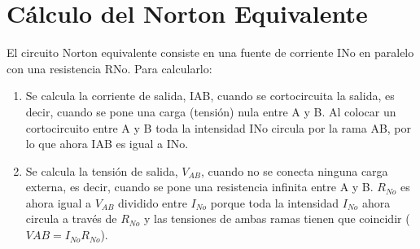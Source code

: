 \documentclass[a4paper,12pt]{report}
\begin{document}
\section{Cálculo del Norton Equivalente}
El circuito Norton equivalente consiste en una fuente de corriente INo en paralelo con una resistencia RNo. Para calcularlo:
\begin{enumerate}
\item Se calcula la corriente de salida, IAB, cuando se cortocircuita la salida, es decir, cuando se pone una carga (tensión) nula entre A y B. Al colocar un cortocircuito entre A y B toda la intensidad INo circula por la rama AB, por lo que ahora IAB es igual a INo.
\item Se calcula la tensión de salida, $V_{AB}$, cuando no se conecta ninguna carga externa, es decir, cuando se pone una resistencia infinita entre A y B. $R_{No}$ es ahora igual a $V_{AB}$ dividido entre $I_{No}$ porque toda la intensidad $I_{No}$ ahora circula a través de $R_{No}$ y las tensiones de ambas ramas tienen que coincidir ( $VAB = I_{No}R_{No}$).
\end{enumerate}
\end{document}
